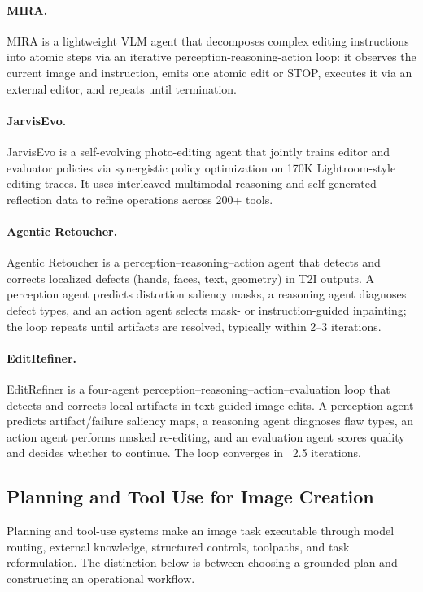 \paragraph{MIRA.}
MIRA is a lightweight VLM agent that decomposes complex editing instructions into atomic steps via an iterative perception-reasoning-action loop: it observes the current image and instruction, emits one atomic edit or STOP, executes it via an external editor, and repeats until termination. ~\cite{avg251121087}

\paragraph{JarvisEvo.}
JarvisEvo is a self-evolving photo-editing agent that jointly trains editor and evaluator policies via synergistic policy optimization on 170K Lightroom-style editing traces. It uses interleaved multimodal reasoning and self-generated reflection data to refine operations across 200+ tools. ~\cite{avg251123002}

\paragraph{Agentic Retoucher.}
Agentic Retoucher is a perception–reasoning–action agent that detects and corrects localized defects (hands, faces, text, geometry) in T2I outputs. A perception agent predicts distortion saliency masks, a reasoning agent diagnoses defect types, and an action agent selects mask- or instruction-guided inpainting; the loop repeats until artifacts are resolved, typically within 2–3 iterations. ~\cite{avg260102046}

\paragraph{EditRefiner.}
EditRefiner is a four-agent perception–reasoning–action–evaluation loop that detects and corrects local artifacts in text-guided image edits. A perception agent predicts artifact/failure saliency maps, a reasoning agent diagnoses flaw types, an action agent performs masked re-editing, and an evaluation agent scores quality and decides whether to continue. The loop converges in ~2.5 iterations. ~\cite{avg260507457}

\subsection{Planning and Tool Use for Image Creation}
Planning and tool-use systems make an image task executable through model routing, external knowledge, structured controls, toolpaths, and task reformulation. The distinction below is between choosing a grounded plan and constructing an operational workflow.

